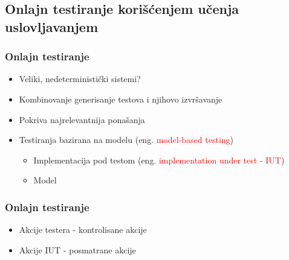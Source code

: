 \documentclass[11pt]{beamer}
\theoremstyle{definition}
\begin{document}
{%

\subsection{Onlajn testiranje korišćenjem učenja uslovljavanjem}
\label{subsec:online-rl}
\begin{frame}
\frametitle{Onlajn testiranje}

\begin{itemize}
	\item Veliki, nedeterministički sistemi?
	\item Kombinovanje generisanje testova i njihovo izvršavanje
	\item Pokriva najrelevantnija ponašanja
	\item Testiranja bazirana na modelu (eng. \textcolor{red}{model-based testing})
	\begin{itemize}
		\item Implementacija pod testom \newline (eng. \textcolor{red}{implementation under test - IUT})
		\item Model	
	\end{itemize}
\end{itemize}




\end{frame}

\begin{frame}
\frametitle{Onlajn testiranje}

\begin{itemize}
	\item Akcije testera - kontrolisane akcije
	\item Akcije IUT - posmatrane akcije



\end{itemize}
\end{frame}}
\end{document}
